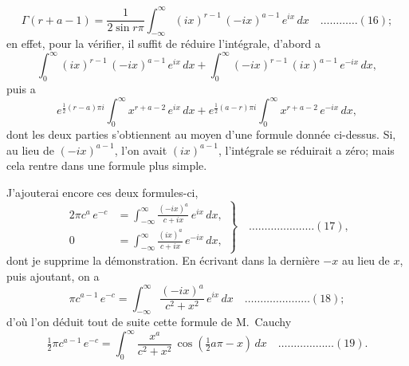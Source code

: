 \documentclass[12pt,a4paper]{article}
\theoremstyle{plain}
\begin{document}
\[
\Gamma(r + a - 1) = \frac{1}{2\sin r\pi} \int_{-\infty}^{\infty} (ix)^{r-1}\, (-ix)^{a-1}\, e^{ix}\, dx \quad \ldots \ldots \ldots \ldots (16);
\]
en effet, pour la v\'erifier, il suffit de r\'eduire l'int\'egrale, d'abord a
\[
\int_0^{\infty} (ix)^{r-1}\, (-ix)^{a-1}\, e^{ix}\, dx + \int_0^{\infty} (-ix)^{r-1}\, (ix)^{a-1}\, e^{-ix}\, dx,
\]
puis a
\[
e^{\frac{1}{2}(r-a)\pi i} \int_0^{\infty} x^{r+a-2}\, e^{ix}\, dx + e^{\frac{1}{2}(a-r)\pi i} \int_0^{\infty} x^{r+a-2}\, e^{-ix}\, dx,
\]
dont les deux parties s'obtiennent au moyen d'une formule donn\'ee ci-dessus. Si, au lieu de $(-ix)^{a-1}$, l'on avait $(ix)^{a-1}$, l'int\'egrale se r\'eduirait a z\'ero; mais cela rentre dans une formule plus simple.

J'ajouterai encore ces deux formules-ci,
\[
\left. \begin{aligned}
2\pi c^a \, e^{-c} &= \int_{-\infty}^{\infty} \frac{(-ix)^a}{c + ix} \, e^{ix}\, dx, \\ 
0 &= \int_{-\infty}^{\infty} \frac{(ix)^a}{c + ix} \, e^{-ix}\, dx,
\end{aligned} \right\} \quad \ldots \ldots \ldots \ldots \ldots \ldots \ldots (17),
\]
dont je supprime la d\'emonstration. En \'ecrivant dans la derni\`ere $-x$ au lieu de $x$, puis ajoutant, on a
\[
\pi c^{a-1} \, e^{-c} = \int_{-\infty}^{\infty} \frac{(-ix)^a}{c^2 + x^2} \, e^{ix}\, dx \quad \ldots \ldots \ldots \ldots \ldots \ldots \ldots (18);
\]
d'o\`u l'on d\'eduit tout de suite cette formule de M.~Cauchy
\[
\tfrac{1}{2}\pi c^{a-1} \, e^{-c} = \int_0^{\infty} \frac{x^a}{c^2 + x^2} \, \cos(\tfrac{1}{2}a\pi - x)\, dx \quad \ldots \ldots \ldots \ldots \ldots \ldots (19).
\]
\end{document}
